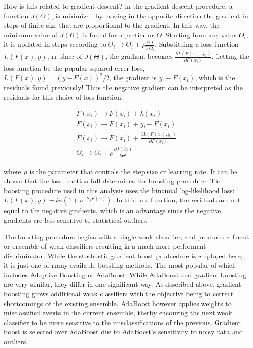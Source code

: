 How is this related to gradient descent? In the gradient descent procedure, a function $J(\Theta)$, is minimized by moving in the opposite direction the gradient in steps
of finite size that are proportional to the gradient. In this way, the minimum value of $J(\Theta)$ is found for a particular $\Theta$. Starting from any value $\Theta_{i}$,
it is updated in steps according to $\Theta_{i} \rightarrow \Theta_{i} + \rho\frac{\partial~J}{\partial~\Theta_{i}}$. 
Substituing a loss function $L(F(x),y)$, in place of $J(\Theta)$, the gradient becomes $\frac{\partial L(F(x_{i}),y_{i})}{\partial F(x_{i})}$. Letting the loss function be the popular squared error loss,
$L(F(x),y) = (y-F(x))^{2}/2$, the gradient is $y_{i}-F(x_{i})$, which is the residuals found previously! Thus the negative gradient can be interpreted as the residuals for this
choice of loss function. 

\begin{equation}
\begin{aligned}
\label{eqn:residual1}
F(x_{i}) \rightarrow F(x_{i}) + h(x_{i}) \\ F(x_{i}) \rightarrow F(x_{i}) + y_{i} - F(x_{i}) \\ F(x_{i}) \rightarrow F(x_{i}) + \frac{\partial L(F(x_{i}),y_{i})}{\partial F(x_{i})} \\ \Theta_{i} \rightarrow \Theta_{i} + \rho\frac{\partial J(\Theta_{i})}{\partial \Theta_{i}}
\end{aligned} 
\end{equation}

\noindent where $\rho$ is the parameter that controls the step size or learning rate. It can be shown that the loss function full determines the boosting procedure. The boosting procedure
used in this analysis uses the binomial log-likelihood loss: $L(F(x),y) = ln(1+e^{-2yF(x)})$. In this loss function, the residuals are not equal to the negative gradients, which
is an advantage since the negative gradients are less sensitive to statistical outliers.

The boosting procedure begins with a single weak classifier, and produces a forest or ensemble of weak classifiers resulting in a much more performant discriminator. While the stochastic
gradient boost prodcedure is employed here, it is just one of many available boosting methods. The most popular of which includes Adaptive Boosting or AdaBoost. While AdaBoost and
gradient boosting are very similar, they differ in one significant way. As described above, gradient boosting grows additional weak classifiers with the objective being to correct
shortcomings of the existing ensemble. AdaBoost however applies weights to misclassified events in the current ensemble, therby encouring the next weak classifier to be more sensitive
to the misclassifications of the previous. Gradient boost is selected over AdaBoost due to AdaBoost's sensitivity to noisy data and outliers. 

